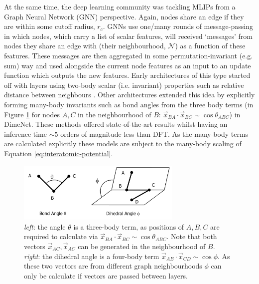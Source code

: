 
At the same time, the deep learning community was tackling MLIPs from a Graph Neural Network (GNN) perspective. Again, nodes share an edge if they are within some cutoff radius, $r_c$. GNNs use one/many rounds of message-passing in which nodes, which carry a list of scalar features, will received `messages' from nodes they share an edge with (their neighbourhood, $\mathcal N$) as a function of these features. These messages are then aggregated in some permutation-invariant (e.g. sum) way and used alongside the current node features as an input to an update function which outputs the new features. Early architectures of this type started off with layers using two-body scalar (i.e. invariant) properties such as relative distance between neighbours \cite{gilmer2017neural, schutt2017schnet}. Other architectures \cite{gasteiger2020directional, liu2021spherical, gasteiger2021gemnet} extended this idea by explicitly forming many-body invariants such as bond angles from the three body terms (in Figure \ref{fig:angles} for nodes $A,C$ in the neighbourhood of $B$: $\vec x_{BA} \cdot \vec x _{BC} \sim \cos \theta_{ABC}$) in DimeNet. These methods offered state-of-the-art results whilst having an inference time $\sim 5$ orders of magnitude less than DFT. As the many-body terms are calculated explicitly these models are subject to the many-body scaling of Equation \ref{eq:interatomic-potential}.

\begin{figure}[H]
    \centering
    \includegraphics[width=0.7\textwidth]{figures/angles.png}
    \caption{\textit{left}: the angle $\theta$ is a three-body term, as positions of $A, B, C$ are required to calculate via $\vec x_{BA} \cdot \vec x _{BC} \sim \cos \theta_{ABC}$. Note that both vectors $\vec x _{AC}, \vec x _{AC}$ can be generated in the neighbourhood of $B$.\\\textit{right}: the dihedral angle is a four-body term $\vec x_{AB} \cdot \vec x_{CD} \sim \cos \phi$. As these two vectors are from different graph neighbourhoods $\phi$ can only be calculate if vectors are passed between layers. \cite{chemHope2023}}
    \label{fig:angles}
\end{figure}

